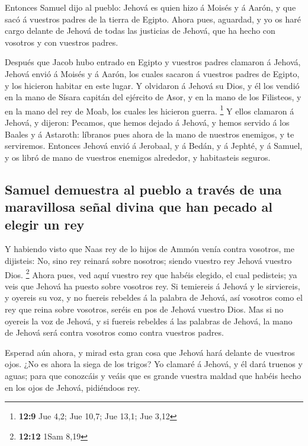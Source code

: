  Entonces Samuel dijo al pueblo: Jehová es quien hizo á
Moisés y á Aarón, y que sacó á vuestros padres de la tierra de Egipto.
 Ahora pues, aguardad, y yo os haré cargo delante de
Jehová de todas las justicias de Jehová, que ha hecho con vosotros y con
vuestros padres.

 Después que Jacob hubo entrado en Egipto y vuestros
padres clamaron á Jehová, Jehová envió á Moisés y á Aarón, los cuales
sacaron á vuestros padres de Egipto, y los hicieron habitar en este
lugar.  Y olvidaron á Jehová su Dios, y él los vendió en
la mano de Sísara capitán del ejército de Asor, y en la mano de los
Filisteos, y en la mano del rey de Moab, los cuales les hicieron guerra.
\footnote{\textbf{12:9} Jue 4,2; Jue 10,7; Jue 13,1; Jue 3,12}
 Y ellos clamaron á Jehová, y dijeron: Pecamos, que hemos
dejado á Jehová, y hemos servido á los Baales y á Astaroth: líbranos
pues ahora de la mano de nuestros enemigos, y te serviremos.
 Entonces Jehová envió á Jerobaal, y á Bedán, y á Jephté,
y á Samuel, y os libró de mano de vuestros enemigos alrededor, y
habitasteis seguros.

\hypertarget{samuel-demuestra-al-pueblo-a-travuxe9s-de-una-maravillosa-seuxf1al-divina-que-han-pecado-al-elegir-un-rey}{%
\subsection{Samuel demuestra al pueblo a través de una maravillosa señal
divina que han pecado al elegir un
rey}\label{samuel-demuestra-al-pueblo-a-travuxe9s-de-una-maravillosa-seuxf1al-divina-que-han-pecado-al-elegir-un-rey}}

 Y habiendo visto que Naas rey de lo hijos de Ammón venía
contra vosotros, me dijisteis: No, sino rey reinará sobre nosotros;
siendo vuestro rey Jehová vuestro Dios. \footnote{\textbf{12:12} 1Sam
  8,19}  Ahora pues, ved aquí vuestro rey que habéis
elegido, el cual pedisteis; ya veis que Jehová ha puesto sobre vosotros
rey.  Si temiereis á Jehová y le sirviereis, y oyereis su
voz, y no fuereis rebeldes á la palabra de Jehová, así vosotros como el
rey que reina sobre vosotros, seréis en pos de Jehová vuestro Dios.
 Mas si no oyereis la voz de Jehová, y si fuereis
rebeldes á las palabras de Jehová, la mano de Jehová será contra
vosotros como contra vuestros padres.

 Esperad aún ahora, y mirad esta gran cosa que Jehová
hará delante de vuestros ojos.  ¿No es ahora la siega de
los trigos? Yo clamaré á Jehová, y él dará truenos y aguas; para que
conozcáis y veáis que es grande vuestra maldad que habéis hecho en los
ojos de Jehová, pidiéndoos rey.

